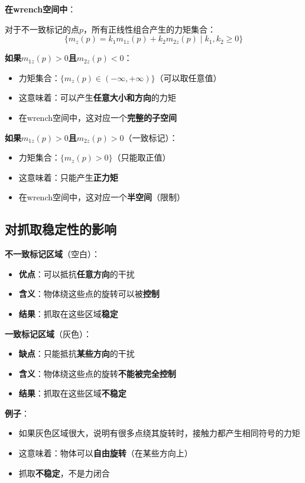 \documentclass[12pt,a4paper]{article}
\begin{document}
\textbf{在wrench空间中}：

对于不一致标记的点$p$，所有正线性组合产生的力矩集合：
\begin{equation}
\{m_z(p) = k_1 m_{1z}(p) + k_2 m_{2z}(p) \mid k_1, k_2 \geq 0\}
\end{equation}

\textbf{如果$m_{1z}(p) > 0$且$m_{2z}(p) < 0$}：
\begin{itemize}
\item 力矩集合：$\{m_z(p) \in (-\infty, +\infty)\}$（可以取任意值）
\item 这意味着：可以产生\textbf{任意大小和方向}的力矩
\item 在wrench空间中，这对应一个\textbf{完整的子空间}
\end{itemize}

\textbf{如果$m_{1z}(p) > 0$且$m_{2z}(p) > 0$}（一致标记）：
\begin{itemize}
\item 力矩集合：$\{m_z(p) > 0\}$（只能取正值）
\item 这意味着：只能产生\textbf{正力矩}
\item 在wrench空间中，这对应一个\textbf{半空间}（限制）
\end{itemize}

\subsection{对抓取稳定性的影响}

\textbf{不一致标记区域}（空白）：
\begin{itemize}
\item \textbf{优点}：可以抵抗\textbf{任意方向}的干扰
\item \textbf{含义}：物体绕这些点的旋转可以被\textbf{控制}
\item \textbf{结果}：抓取在这些区域\textbf{稳定}
\end{itemize}

\textbf{一致标记区域}（灰色）：
\begin{itemize}
\item \textbf{缺点}：只能抵抗\textbf{某些方向}的干扰
\item \textbf{含义}：物体绕这些点的旋转\textbf{不能被完全控制}
\item \textbf{结果}：抓取在这些区域\textbf{不稳定}
\end{itemize}

\textbf{例子}：
\begin{itemize}
\item 如果灰色区域很大，说明有很多点绕其旋转时，接触力都产生相同符号的力矩
\item 这意味着：物体可以\textbf{自由旋转}（在某些方向上）
\item 抓取\textbf{不稳定}，不是力闭合
\end{itemize}
\end{document}
